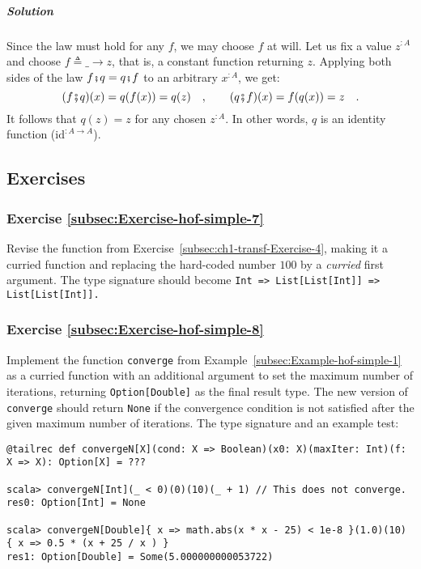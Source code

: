 \subparagraph{Solution}

Since the law must hold for any $f$, we may choose $f$ at will.
Let us fix a value $z^{:A}$ and choose $f\triangleq\_\rightarrow z$,
that is, a constant function returning $z$. Applying both sides of
the law $f\bef q=q\bef f$ to an arbitrary $x^{:A}$, we get:
\[
(f\bef q)(x)=q(f(x))=q(z)\quad,\quad\quad(q\bef f)(x)=f(q(x))=z\quad.
\]
It follows that $q(z)=z$ for any chosen $z^{:A}$. In other words,
$q$ is an identity function ($\text{id}^{:A\rightarrow A}$).

\subsection{Exercises}

\subsubsection{Exercise \label{subsec:Exercise-hof-simple-7}\ref{subsec:Exercise-hof-simple-7}}

Revise the function from Exercise~\ref{subsec:ch1-transf-Exercise-4},
making it a curried function and replacing the hard-coded number $100$
by a \emph{curried} first argument. The type signature should become
\texttt{}\lstinline!Int => List[List[Int]] => List[List[Int]]!\texttt{.}

\subsubsection{Exercise \label{subsec:Exercise-hof-simple-8}\ref{subsec:Exercise-hof-simple-8}}

Implement the function \lstinline!converge! from Example~\ref{subsec:Example-hof-simple-1}
as a curried function with an additional argument to set the maximum
number of iterations, returning \lstinline!Option[Double]! as the
final result type. The new version of \lstinline!converge! should
return \lstinline!None! if the convergence condition is not satisfied
after the given maximum number of iterations. The type signature and
an example test:
\begin{lstlisting}
@tailrec def convergeN[X](cond: X => Boolean)(x0: X)(maxIter: Int)(f: X => X): Option[X] = ???

scala> convergeN[Int](_ < 0)(0)(10)(_ + 1) // This does not converge.
res0: Option[Int] = None

scala> convergeN[Double]{ x => math.abs(x * x - 25) < 1e-8 }(1.0)(10) { x => 0.5 * (x + 25 / x ) }
res1: Option[Double] = Some(5.000000000053722)
\end{lstlisting}


